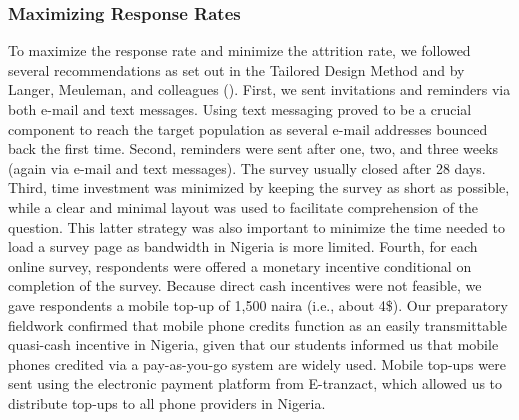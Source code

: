 \subsubsection{Maximizing Response Rates}
\label{app:C12}
To maximize the response rate and minimize the attrition rate, we followed several recommendations as set out in the Tailored Design Method \citep[TDM;][]{Dillman1978, Dillman2014} and by Langer, Meuleman, and colleagues (\citeyear{Langer2017a, Meuleman2018}). First, we sent invitations and reminders via both e-mail and text messages. Using text messaging proved to be a crucial component to reach the target population as several e-mail addresses bounced back the first time. Second, reminders were sent after one, two, and three weeks (again via e-mail and text messages). The survey usually closed after 28 days. Third, time investment was minimized by keeping the survey as short as possible, while a clear and minimal layout was used to facilitate comprehension of the question. This latter strategy was also important to minimize the time needed to load a survey page as bandwidth in Nigeria is more limited. Fourth, for each online survey, respondents were offered a monetary incentive conditional on completion of the survey. Because direct cash incentives were not feasible, we gave respondents a mobile top-up of 1,500 naira (i.e., about 4\$). Our preparatory fieldwork confirmed that mobile phone credits function as an easily transmittable quasi-cash incentive in Nigeria, given that our students informed us that mobile phones credited via a pay-as-you-go system are widely used. Mobile top-ups were sent using the electronic payment platform from E-tranzact, which allowed us to distribute top-ups to all phone providers in Nigeria.


